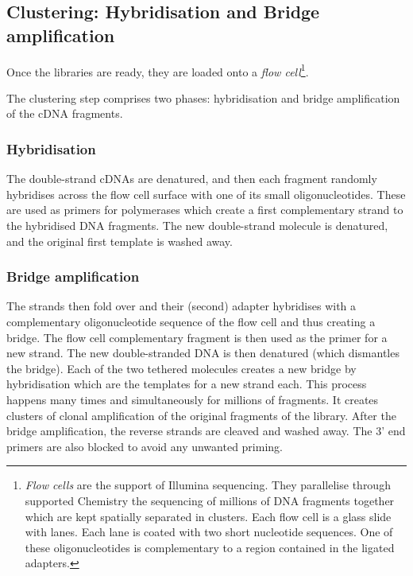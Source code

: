 \subsection[Clustering: Hybridisation and Bridge amplification]{Clustering:
Hybridisation and Bridge amplification~\small{}\quad}%
\label{sub:HybridClustAmp}

\vspace{-4mm}
Once the libraries are ready, they are loaded onto a \emph{flow cell}\footnote{%
\emph{Flow cells} are the support of Illumina sequencing. They parallelise
through supported Chemistry
the sequencing of millions of \gls{DNA} fragments together
which are kept spatially separated in clusters.
Each flow cell is a glass slide with lanes.
Each lane is coated with two short nucleotide sequences. One of these
oligonucleotides is complementary to a region contained in the ligated adapters.}.\mybr\

The clustering step comprises two phases: hybridisation and bridge amplification
of the \gls{cDNA} fragments.\mybr\

\subsubsection{Hybridisation}

The double-strand \glspl{cDNA} are denatured, and then each fragment randomly
hybridises across the flow cell surface with one of its small oligonucleotides.
These are used as primers for polymerases which create a first complementary
strand to the hybridised \gls{DNA} fragments. The new double-strand molecule is
denatured, and the original first template is washed away.\mybr\

\subsubsection{Bridge amplification}
The strands then fold over and their (second) adapter hybridises with a
complementary oligonucleotide sequence of the flow cell and thus creating a
bridge. The flow cell complementary fragment is then used as the primer for a new
strand. The new double-stranded \gls{DNA} is then denatured (which
dismantles the bridge). Each of the two tethered molecules creates a new
bridge by hybridisation which are the templates for a new strand each.
This process happens many times and simultaneously for millions of fragments.
It creates clusters of clonal amplification of the original fragments of
the library. After the bridge amplification, the reverse strands are cleaved
and washed away. The 3' end primers are also blocked to avoid any unwanted
priming.\mybr\


